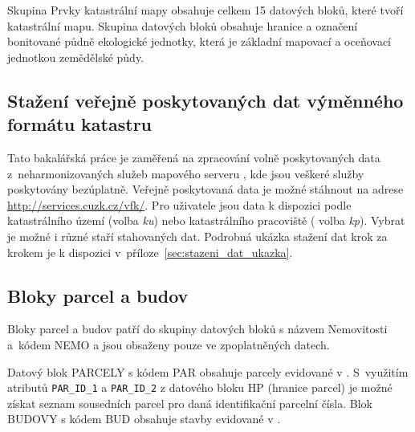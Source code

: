 Skupina Prvky katastrální mapy obsahuje celkem 15 datových bloků,
které tvoří katastrální mapu. Skupina datových bloků 
obsahuje hranice a označení bonitované půdně ekologické jednotky,
která je základní mapovací a oceňovací jednotkou zemědělské půdy.
\subsection{Stažení veřejně poskytovaných dat výměnného formátu katastru}
Tato bakalářská práce je zaměřená na zpracování volně
poskytovaných data z~neharmonizovaných služeb mapového serveru
, kde jsou veškeré služby poskytovány bezúplatně. Veřejně poskytovaná data  je
možné stáhnout na adrese \\
\href{http://services.cuzk.cz/vfk/}{http://services.cuzk.cz/vfk/}. Pro uživatele 
 jsou data k dispozici podle katastrálního území (volba \textit{ku}) nebo katastrálního pracoviště ( volba \textit{kp}). 
Vybrat je možné i různé staří stahovaných dat.  Podrobná
 ukázka stažení dat krok za krokem je k dispozici
 v~příloze~\ref{sec:stazeni_dat_ukazka}.
\subsection{Bloky parcel a budov}
\label{subsec:bloky_par_bud}
Bloky parcel a budov patří do skupiny datových bloků s názvem Nemovitosti
a~kódem NEMO a jsou obsaženy pouze ve zpoplatněných datech.

Datový blok PARCELY s kódem PAR obsahuje parcely evidované v
. S~využitím atributů \verb|PAR_ID_1| a \verb|PAR_ID_2| z
datového bloku HP (hranice parcel) je možné získat seznam sousedních
parcel pro daná identifikační parcelní čísla. Blok BUDOVY s kódem BUD
obsahuje stavby evidované v .
 
